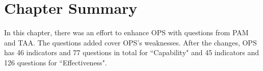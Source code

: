 

\section{Chapter Summary}
In this chapter, there was an effort to enhance \ac{OPS} with questions from \ac{PAM} and \ac{TAA}. The questions added cover \ac{OPS}'s weaknesses. After the changes, \ac{OPS} has 46 indicators and 77 questions in total for ``Capability" and 45 indicators and 126 questions for ``Effectiveness".











